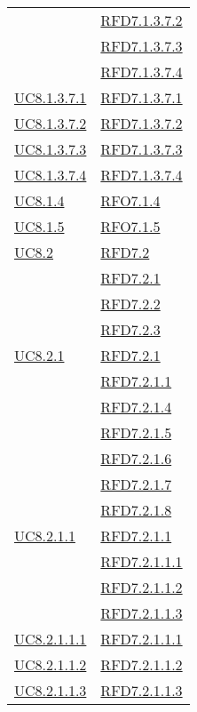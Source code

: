 \begin{longtable}{|>{\centering}m{5cm}|m{5cm}<{\centering}|}
& \hyperlink{RFD7.1.3.7.2}{RFD7.1.3.7.2}\\
& \hyperlink{RFD7.1.3.7.3}{RFD7.1.3.7.3}\\
& \hyperlink{RFD7.1.3.7.4}{RFD7.1.3.7.4}\\ \hline
\hyperref[UC8.1.3.7.1]{UC8.1.3.7.1} & \hyperlink{RFD7.1.3.7.1}{RFD7.1.3.7.1}\\ \hline
\hyperref[UC8.1.3.7.2]{UC8.1.3.7.2} & \hyperlink{RFD7.1.3.7.2}{RFD7.1.3.7.2}\\ \hline
\hyperref[UC8.1.3.7.3]{UC8.1.3.7.3} & \hyperlink{RFD7.1.3.7.3}{RFD7.1.3.7.3}\\ \hline
\hyperref[UC8.1.3.7.4]{UC8.1.3.7.4} & \hyperlink{RFD7.1.3.7.4}{RFD7.1.3.7.4}\\ \hline
\hyperref[UC8.1.4]{UC8.1.4} & \hyperlink{RFO7.1.4}{RFO7.1.4}\\ \hline
\hyperref[UC8.1.5]{UC8.1.5} & \hyperlink{RFO7.1.5}{RFO7.1.5}\\ \hline
\hyperref[UC8.2]{UC8.2} & \hyperlink{RFD7.2}{RFD7.2}\\
& \hyperlink{RFD7.2.1}{RFD7.2.1}\\
& \hyperlink{RFD7.2.2}{RFD7.2.2}\\
& \hyperlink{RFD7.2.3}{RFD7.2.3}\\ \hline
\hyperref[UC8.2.1]{UC8.2.1} & \hyperlink{RFD7.2.1}{RFD7.2.1}\\
& \hyperlink{RFD7.2.1.1}{RFD7.2.1.1}\\
& \hyperlink{RFD7.2.1.4}{RFD7.2.1.4}\\
& \hyperlink{RFD7.2.1.5}{RFD7.2.1.5}\\
& \hyperlink{RFD7.2.1.6}{RFD7.2.1.6}\\
& \hyperlink{RFD7.2.1.7}{RFD7.2.1.7}\\
& \hyperlink{RFD7.2.1.8}{RFD7.2.1.8}\\ \hline
\hyperref[UC8.2.1.1]{UC8.2.1.1} & \hyperlink{RFD7.2.1.1}{RFD7.2.1.1}\\
& \hyperlink{RFD7.2.1.1.1}{RFD7.2.1.1.1}\\
& \hyperlink{RFD7.2.1.1.2}{RFD7.2.1.1.2}\\
& \hyperlink{RFD7.2.1.1.3}{RFD7.2.1.1.3}\\ \hline
\hyperref[UC8.2.1.1.1]{UC8.2.1.1.1} & \hyperlink{RFD7.2.1.1.1}{RFD7.2.1.1.1}\\ \hline
\hyperref[UC8.2.1.1.2]{UC8.2.1.1.2} & \hyperlink{RFD7.2.1.1.2}{RFD7.2.1.1.2}\\ \hline
\hyperref[UC8.2.1.1.3]{UC8.2.1.1.3} & \hyperlink{RFD7.2.1.1.3}{RFD7.2.1.1.3}\\ \hline

\end{longtable}
